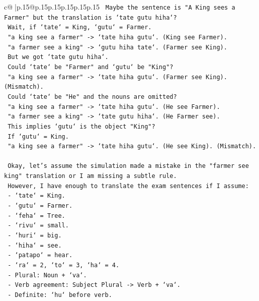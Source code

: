 \documentclass{article}
\begin{document}
{\begin{supertabular}{c@{$\;$}|p{.15\linewidth}@{}p{.15\linewidth}p{.15\linewidth}p{.15\linewidth}p{.15\linewidth}p{.15\linewidth}}
{{{\texttt{    Maybe the sentence is "A King sees a Farmer" but the translation is `tate gutu hiha`?} \\
\texttt{    Wait, if `tate` = King, `gutu` = Farmer.} \\
\texttt{    "a king see a farmer" {-}> `tate hiha gutu`. (King see Farmer).} \\
\texttt{    "a farmer see a king" {-}> `gutu hiha tate`. (Farmer see King).} \\
\texttt{    But we got `tate gutu hiha`.} \\
\texttt{    Could `tate` be "Farmer" and `gutu` be "King"?} \\
\texttt{    "a king see a farmer" {-}> `tate hiha gutu`. (Farmer see King). (Mismatch).} \\
\texttt{    Could `tate` be "He" and the nouns are omitted?} \\
\texttt{    "a king see a farmer" {-}> `tate hiha gutu`. (He see Farmer).} \\
\texttt{    "a farmer see a king" {-}> `tate gutu hiha`. (He Farmer see).} \\
\texttt{    This implies `gutu` is the object "King"?} \\
\texttt{    If `gutu` = King.} \\
\texttt{    "a king see a farmer" {-}> `tate hiha gutu`. (He see King). (Mismatch).} \\
\\ 
\texttt{    Okay, let's assume the simulation made a mistake in the "farmer see king" translation or I am missing a subtle rule.} \\
\texttt{    However, I have enough to translate the exam sentences if I assume:} \\
\texttt{    {-} `tate` = King.} \\
\texttt{    {-} `gutu` = Farmer.} \\
\texttt{    {-} `feha` = Tree.} \\
\texttt{    {-} `rivu` = small.} \\
\texttt{    {-} `huri` = big.} \\
\texttt{    {-} `hiha` = see.} \\
\texttt{    {-} `patapo` = hear.} \\
\texttt{    {-} `ra` = 2, `to` = 3, `ha` = 4.} \\
\texttt{    {-} Plural: Noun + `va`.} \\
\texttt{    {-} Verb agreement: Subject Plural {-}> Verb + `va`.} \\
\texttt{    {-} Definite: `hu` before verb.} \\
}}}
\end{supertabular}}
\end{document}

